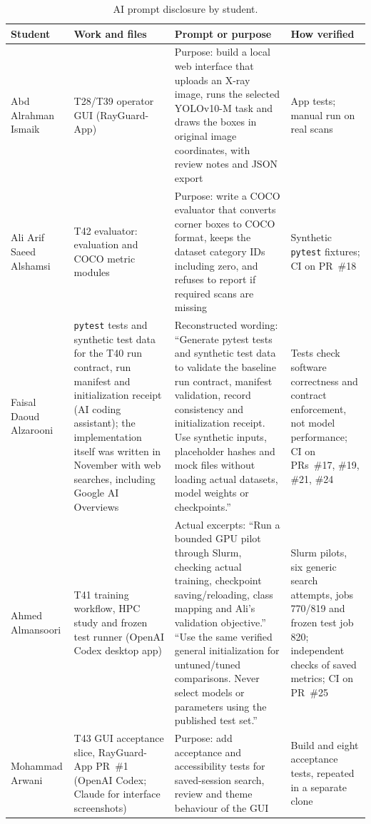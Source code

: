 \begin{table}[htbp]
\centering\tablesetup
\caption{AI prompt disclosure by student.}
\label{tab:prompts}
\begin{tabularx}{\textwidth}{@{}L{0.15\textwidth}L{0.2\textwidth}YL{0.2\textwidth}@{}}
\toprule
Student & Work and files & Prompt or purpose & How verified\\
\midrule
Abd Alrahman Ismaik & T28/T39 operator GUI (RayGuard-App) & Purpose: build a local web
interface that uploads an X-ray image, runs the selected YOLOv10-M task and draws
the boxes in original image coordinates, with review notes and JSON export &
App tests; manual run on real scans\\
Ali Arif Saeed Alshamsi & T42 evaluator: evaluation and COCO metric modules & Purpose: write a COCO evaluator that converts corner boxes to
COCO format, keeps the dataset category IDs including zero, and refuses to report
if required scans are missing & Synthetic \texttt{pytest} fixtures; CI on
PR~\#18\\
Faisal Daoud Alzarooni & \texttt{pytest} tests and synthetic test data for the
T40 run contract, run manifest and initialization receipt (AI coding assistant);
the implementation itself was written in November with web searches, including
Google AI Overviews &
Reconstructed wording: ``Generate pytest tests and synthetic test data to validate
the baseline run contract, manifest validation, record consistency and
initialization receipt. Use synthetic inputs, placeholder hashes and mock files
without loading actual datasets, model weights or checkpoints.''
& Tests check software correctness and contract enforcement, not model
performance; CI on PRs~\#17, \#19, \#21, \#24\\
Ahmed Almansoori & T41 training workflow, HPC study and frozen test runner
(OpenAI Codex desktop app) & Actual excerpts: ``Run a bounded GPU pilot through
Slurm, checking actual training, checkpoint saving/reloading, class mapping and
Ali's validation objective.'' ``Use the same verified general initialization for
untuned/tuned comparisons. Never select models or parameters using the published
test set.'' & Slurm pilots, six generic search attempts, jobs 770/819 and frozen
test job 820; independent checks of saved metrics; CI on PR~\#25\\
Mohammad Arwani & T43 GUI acceptance slice, RayGuard-App PR~\#1 (OpenAI Codex; Claude for interface screenshots) & Purpose: add acceptance and
accessibility tests for saved-session search, review and theme behaviour of the GUI &
Build and eight acceptance tests, repeated in a separate clone\\
\bottomrule
\end{tabularx}
\end{table}
